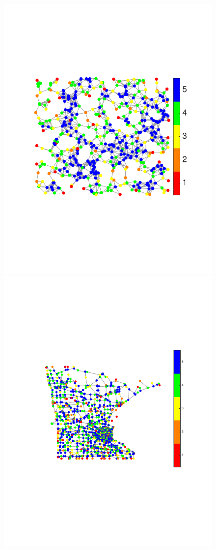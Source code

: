 \documentclass{article}
\begin{document}
\begin{figure}[tb]
\begin{minipage}[m]{0.05\linewidth}
\centerline{\includegraphics[width=.9\linewidth]{fig_uniq_part_col2}}
\end{minipage}
\hspace{.003\linewidth}
\begin{minipage}[m]{0.47\linewidth}
\centerline{\includegraphics[width=\linewidth]{fig_uniq_part_minn4}}

\end{minipage}
\end{figure}
\end{document}
